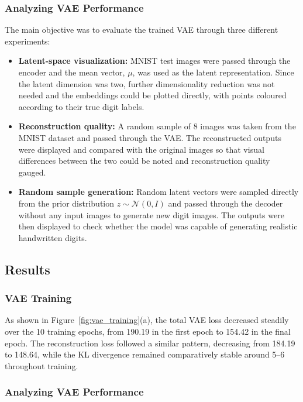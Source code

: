 \documentclass{article}
\begin{document}
\subsubsection{Analyzing VAE Performance}
The main objective was to evaluate the trained VAE through three different experiments:

\begin{itemize}
    \item \textbf{Latent-space visualization:} MNIST test images were passed through the encoder and the mean vector, $\mu$, was used as the latent representation. Since the latent dimension was two, further dimensionality reduction was not needed and the embeddings could be plotted directly, with points coloured according to their true digit labels.

    \item \textbf{Reconstruction quality:} A random sample of 8 images was taken from the MNIST dataset and passed through the VAE. The reconstructed outputs were displayed and compared with the original images so that visual differences between the two could be noted and reconstruction quality gauged.

    \item \textbf{Random sample generation:} Random latent vectors were sampled directly from the prior distribution $z \sim \mathcal{N}(0,I)$ and passed through the decoder without any input images to generate new digit images. The outputs were then displayed to check whether the model was capable of generating realistic handwritten digits.
\end{itemize}

\subsection{Results}

\subsubsection{VAE Training}



As shown in Figure~\ref{fig:vae_training}(a), the total VAE loss decreased steadily over the 10 training epochs, from 190.19 in the first epoch to 154.42 in the final epoch. The reconstruction loss followed a similar pattern, decreasing from 184.19 to 148.64, while the KL divergence remained comparatively stable around 5--6 throughout training. 

\subsubsection{Analyzing VAE Performance}
\end{document}
